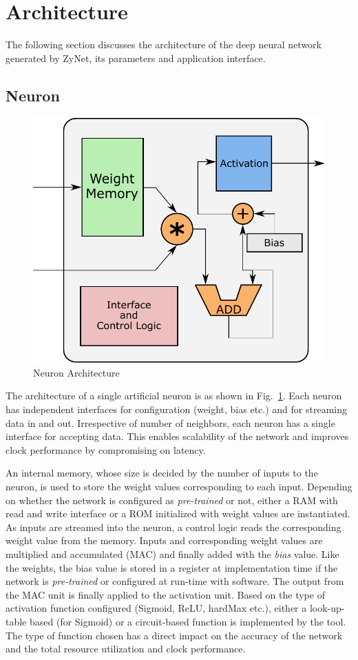 \section{Architecture}
The following section discusses the architecture of the deep neural network generated by ZyNet, its parameters and application interface.
\subsection{Neuron}
\begin{figure}[!t]
\centering
   \includegraphics[width=0.8\columnwidth]{Figures/neuron.pdf}
   \caption{Neuron Architecture}
   \label{fig:neuron}
   \vspace{-3mm}
\end{figure}
The architecture of a single artificial neuron is as shown in Fig.~\ref{fig:neuron}.
Each neuron has independent interfaces for configuration (weight, bias etc.) and for streaming data in and out.
Irrespective of number of neighbors, each neuron has a single interface for accepting data.
This enables scalability of the network and improves clock performance by compromising on latency. 

An internal memory, whose size is decided by the number of inputs to the neuron, is used to store the weight values corresponding to each input.
Depending on whether the network is configured as \emph{pre-trained} or not, either a RAM with read and write interface or a ROM initialized with weight values are instantiated.
As inputs are streamed into the neuron, a control logic reads the corresponding weight value from the memory.
Inputs and corresponding weight values are multiplied and accumulated (MAC) and finally added with the \emph{bias} value.
Like the weights, the bias value is stored in a register at implementation time if the network is \emph{pre-trained} or configured at run-time with software.
The output from the MAC unit is finally applied to the activation unit.
Based on the type of activation function configured (Sigmoid, ReLU, hardMax etc.), either a look-up-table based (for Sigmoid) or a circuit-based function is implemented by the tool.
The type of function chosen has a direct impact on the accuracy of the network and the total resource utilization and clock performance. 

